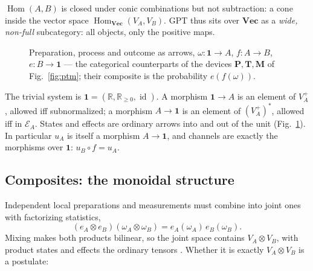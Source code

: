 \documentclass[prl,aps,10pt,superscriptaddress, floatfix]{revtex4-2}
\begin{document}
$\operatorname{Hom}(A,B)$ is closed under conic combinations but not subtraction: a cone inside the vector space $\operatorname{Hom}_{\mathbf{Vec}}(V_A,V_B)$. GPT thus sits over $\mathbf{Vec}$ as a \emph{wide, non-full} subcategory: all objects, only the positive maps.

\begin{figure}[t]
\centering
{}
\caption{Preparation, process and outcome as arrows, $\omega:\mathbf 1\to A$, $f:A\to B$, $e:B\to\mathbf 1$ --- the categorical counterparts of the devices $\mathbf P,\mathbf T,\mathbf M$ of Fig.~\ref{fig:ptm}; their composite is the probability $e(f(\omega))$.}
\label{fig:arrows}
\end{figure}

The trivial system is $\mathbf 1=(\mathbb{R},\mathbb{R}_{\ge0},\operatorname{id})$. A morphism $\mathbf 1\to A$ is an element of $V_A^+$, allowed iff subnormalized; a morphism $A\to\mathbf 1$ is an element of $(V_A^+)^*$, allowed iff in $\mathcal E_A$. States and effects are ordinary arrows into and out of the unit (Fig.~\ref{fig:arrows}). In particular $u_A$ is itself a morphism $A\to\mathbf 1$, and channels are exactly the morphisms over $\mathbf 1$: $u_B\circ f=u_A$.

\subsection{Composites: the monoidal structure}

Independent local preparations and measurements must combine into joint ones with factorizing statistics,
\begin{equation}\label{eq:factorizing}
(e_A\otimes e_B)(\omega_A\otimes\omega_B)=e_A(\omega_A)\,e_B(\omega_B).
\end{equation}
Mixing makes both products bilinear, so the joint space contains $V_A\otimes V_B$, with product states and effects the ordinary tensors \cite{Mueller2021}. Whether it is exactly $V_A\otimes V_B$ is a postulate:
\end{document}
